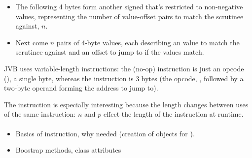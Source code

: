 \documentclass[dissertation.tex]{subfiles}
\begin{document}
{{{{\begin{itemize}
{                    For this description, `offset' means `signed relative address difference from the address of the
                    opcode of the instruction to the address of the target': if a  instruction
                    has opcode at address 10 and is 30 bytes long, the offset used to jump to the immediately subsequent
                    instruction would be 30.

                }
                \item
                {

                    The following 4 bytes form another signed  that's restricted to non-negative values,
                    representing the number of value-offset pairs to match the scrutinee against, \(n\).

                }
                \item
                {

                    Next come \(n\) pairs of 4-byte values, each describing an  value to match the scrutinee
                    against and an offset to jump to if the values match.

                }
                \end{itemize}

                JVB uses variable-length instructions: the  (no-op) instruction is just an opcode
                (), a single byte, whereas the  instruction is 3 bytes (the opcode,
                , followed by a two-byte operand forming the address to jump to).

                The  instruction is especially interesting because the length changes between
                uses of the same instruction: \(n\) and \(p\) effect the length of the instruction at runtime.
            
            }
            \paragraph*{}
            {

                \begin{itemize}
                \item
                {
                    Basics of instruction, why needed (creation of  objects for
                    ).
                }
                \item Boostrap methods, class attributes
                \end{itemize}
            }
        }
}}
\end{document}
